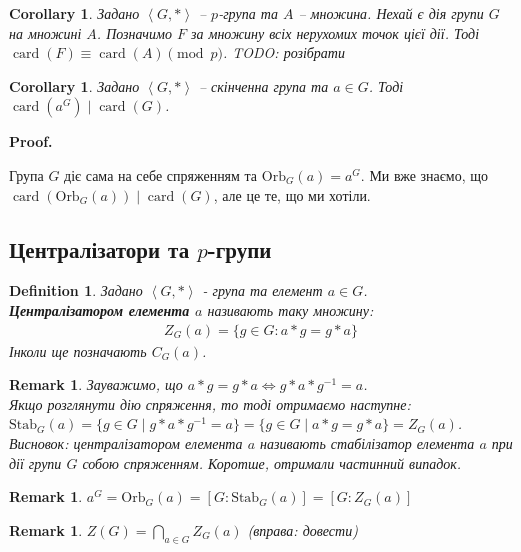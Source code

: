 \documentclass[a4paper, 10pt]{article}
\makeatletter
\theoremstyle{theoremdd}
\theoremstyle{theoremdd}
\newtheorem{definition}[theorem]{Definition}
\theoremstyle{theoremdd}
\theoremstyle{theoremdd}
\theoremstyle{theoremdd}
\theoremstyle{theoremdd}
\theoremstyle{theoremdd}
\theoremstyle{theoremdd}
\theoremstyle{theoremdd}
\theoremstyle{theoremdd}
\theoremstyle{theoremdd}
\newtheorem{remark}[theorem]{Remark}
\theoremstyle{theoremdd}
\theoremstyle{theoremdd}
\theoremstyle{theoremdd}
\newtheorem{corollary}[theorem]{Corollary}
\theoremstyle{theoremdd}
\renewenvironment{proof}[1][Proof.\\]{\par
\pushQED{\hfill \qed}%
\normalfont \topsep6\p@\@plus6\p@\relax
\trivlist
\item\relax
{\bfseries
#1\@addpunct{.}}\hspace\labelsep\ignorespaces
}{%
\popQED\endtrivlist\@endpefalse
}
\DeclareMathOperator{\card}{card}
\newcommand\Orb{\text{Orb}}
\newcommand\Stab{\text{Stab}}
\makeatother
\begin{document}
\begin{corollary}
\label{amount_of_fixed_points}
Задано $\left< G,* \right>$ -- $p$-група та $A$ -- множина. Нехай є дія групи $G$ на множині $A$. Позначимо $F$ за множину всіх нерухомих точок цієї дії. Тоді $\card(F) \equiv \card(A) \pmod {p}$.
\textit{TODO: розібрати}
\end{corollary}

\begin{corollary}
Задано $\left< G,*\right>$ -- скінченна група та $a \in G$. Тоді $\card(a^G) \mid \card(G)$.
\end{corollary}

\begin{proof}
Група $G$ діє сама на себе спряженням та $\Orb_G(a) = a^G$. Ми вже знаємо, що $\card(\Orb_G(a)) \mid \card(G)$, але це те, що ми хотіли.
\end{proof}

\subsection{Централізатори та $p$-групи}
\begin{definition}
Задано $\left< G, *\right>$ - група та елемент $a \in G$.\\
\textbf{Централізатором елемента $a$} називають таку множину:
\begin{align*}
Z_G(a) = \{g \in G: a*g = g*a\}
\end{align*}
Інколи ще позначають $C_G(a)$.
\end{definition}

\begin{remark}
Зауважимо, що $a*g = g*a \iff g*a*g^{-1} = a$.\\
Якщо розглянути дію спряження, то тоді отримаємо наступне:\\
$\Stab_G(a) = \{ g \in G \mid g*a*g^{-1} = a \} = \{g \in G \mid a*g = g*a\} = Z_G(a)$.\\
Висновок: централізатором елемента $a$ називають стабілізатор елемента $a$ при дії групи $G$ собою спряженням. Коротше, отримали частинний випадок.
\end{remark}

\begin{remark}
$a^G = \Orb_G(a) = [G: \Stab_G(a)] = [G: Z_G(a)]$
\end{remark}

\begin{remark}
$Z(G) = \displaystyle\bigcap_{a \in G} Z_G(a)$ \textit{(вправа: довести)}
\end{remark}
\end{document}
